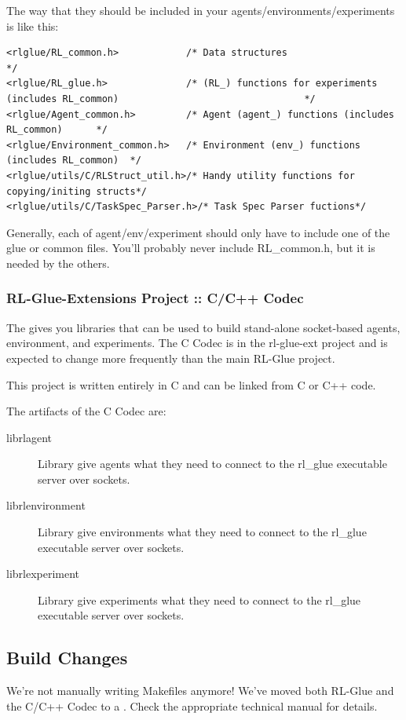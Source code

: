 \documentclass[11pt]{article}
\begin{document}
The way that they should be included in your agents/environments/experiments is like this:
\begin{verbatim}
<rlglue/RL_common.h>            /* Data structures                                     */
<rlglue/RL_glue.h>              /* (RL_) functions for experiments (includes RL_common)                                 */
<rlglue/Agent_common.h>         /* Agent (agent_) functions (includes RL_common)      */
<rlglue/Environment_common.h>   /* Environment (env_) functions (includes RL_common)  */
<rlglue/utils/C/RLStruct_util.h>/* Handy utility functions for copying/initing structs*/
<rlglue/utils/C/TaskSpec_Parser.h>/* Task Spec Parser fuctions*/
\end{verbatim} 

Generally, each of agent/env/experiment should only have to include one of the glue or common files.  You'll probably never include RL\_common.h, but it is needed by the others.

\subsubsection{RL-Glue-Extensions Project :: C/C++ Codec}
The  gives you libraries that can be used to build stand-alone socket-based agents, environment, and experiments.  The C Codec is in the rl-glue-ext project and is expected to change more frequently than the main RL-Glue project.

This project is written entirely in C and can be linked from C or C++ code.

The artifacts of the C Codec are:
\begin{description}
	\item [librlagent] Library give agents what they need to connect to the rl\_glue executable server over sockets.
	\item [librlenvironment] Library give environments what they need to connect to the rl\_glue executable server over sockets.
	\item [librlexperiment] Library give experiments what they need to connect to the rl\_glue executable server over sockets.
\end{description}

\subsection{Build Changes}
We're not manually writing Makefiles anymore!  We've moved both RL-Glue and the C/C++ Codec to a . Check the appropriate technical manual for details.
\end{document}
